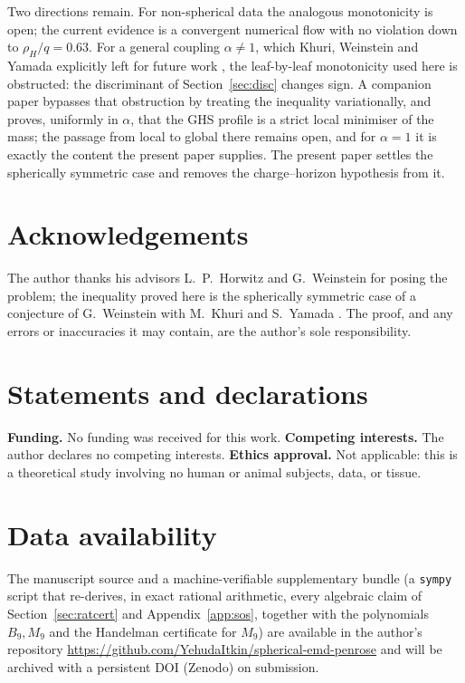 \documentclass[11pt]{article}
\theoremstyle{plain}
\theoremstyle{definition}
\newcommand{\rH}{\rho_{\!H}}
\begin{document}
Two directions remain. For non-spherical data the analogous monotonicity is open; the current evidence is a
convergent numerical flow with no violation down to $\rH/q=0.63$. For a general coupling $\alpha\ne1$, which
Khuri, Weinstein and Yamada explicitly left for future work \cite{KWYext}, the leaf-by-leaf monotonicity used
here is obstructed: the discriminant of Section~\ref{sec:disc} changes sign. A companion paper
\cite{ItkinGeneralAlpha} bypasses that obstruction by treating the inequality variationally, and proves,
uniformly in $\alpha$, that the GHS profile is a strict local minimiser of the mass; the passage from local to
global there remains open, and for $\alpha=1$ it is exactly the content the present paper supplies. The
present paper settles the spherically symmetric case and removes the charge--horizon hypothesis from it.

\section*{Acknowledgements}
The author thanks his advisors L.~P.~Horwitz and G.~Weinstein for posing the problem; the inequality proved
here is the spherically symmetric case of a conjecture of G.~Weinstein with M.~Khuri and S.~Yamada
\cite{KWYext}. The proof, and any errors or inaccuracies it may contain, are the author's sole responsibility.

\section*{Statements and declarations}
\textbf{Funding.} No funding was received for this work. \textbf{Competing interests.} The author declares no
competing interests. \textbf{Ethics approval.} Not applicable: this is a theoretical study involving no human
or animal subjects, data, or tissue.

\section*{Data availability}
The manuscript source and a machine-verifiable supplementary bundle (a \texttt{sympy} script that re-derives, in
exact rational arithmetic, every algebraic claim of Section~\ref{sec:ratcert} and Appendix~\ref{app:sos},
together with the polynomials $B_9,M_9$ and the Handelman certificate for $M_9$) are available in the author's
repository \url{https://github.com/YehudaItkin/spherical-emd-penrose} and will be archived with a
persistent DOI (Zenodo) on submission.
\end{document}
